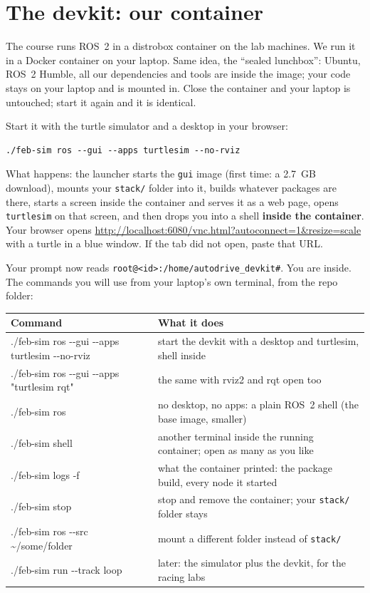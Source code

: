 \documentclass[11pt,a4paper]{article}
\begin{document}
\section{The devkit: our container}

The course runs ROS~2 in a distrobox container on the lab machines. We run it in a Docker
container on your laptop. Same idea, the ``sealed lunchbox'': Ubuntu, ROS~2 Humble, all our
dependencies and tools are inside the image; your code stays on your laptop and is mounted in.
Close the container and your laptop is untouched; start it again and it is identical.

Start it with the turtle simulator and a desktop in your browser:

\begin{lstlisting}
./feb-sim ros --gui --apps turtlesim --no-rviz
\end{lstlisting}

What happens: the launcher starts the \texttt{gui} image (first time: a 2.7~GB download), mounts
your \texttt{stack/} folder into it, builds whatever packages are there, starts a screen inside
the container and serves it as a web page, opens \texttt{turtlesim} on that screen, and then
drops you into a shell \textbf{inside the container}. Your browser opens
\url{http://localhost:6080/vnc.html?autoconnect=1&resize=scale} with a turtle in a blue window.
If the tab did not open, paste that URL.

Your prompt now reads \texttt{root@<id>:/home/autodrive\_devkit\#}. You are inside. The
commands you will use from your laptop's own terminal, from the repo folder:

\noindent\begin{tabularx}{\linewidth}{>{\ttfamily\small}p{8.3cm}X}
\toprule
\normalfont Command & What it does \\
\midrule
./feb-sim ros -{}-gui -{}-apps turtlesim -{}-no-rviz & start the devkit with a desktop and turtlesim, shell inside \\
./feb-sim ros -{}-gui -{}-apps "turtlesim rqt" & the same with rviz2 and rqt open too \\
./feb-sim ros & no desktop, no apps: a plain ROS~2 shell (the base image, smaller) \\
./feb-sim shell & another terminal inside the running container; open as many as you like \\
./feb-sim logs -f & what the container printed: the package build, every node it started \\
./feb-sim stop & stop and remove the container; your \texttt{stack/} folder stays \\
./feb-sim ros -{}-src \textasciitilde{}/some/folder & mount a different folder instead of \texttt{stack/} \\
./feb-sim run -{}-track loop & later: the simulator plus the devkit, for the racing labs \\
\bottomrule
\end{tabularx}
\end{document}
